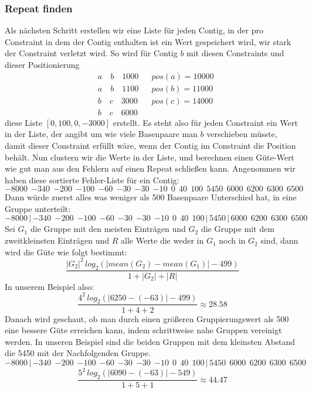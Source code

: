 \documentclass[12pt,ngerman,titlepage,a4paper]{article}
\begin{document}
\subsubsection*{Repeat finden} 
Als nächsten Schritt erstellen wir eine Liste für jeden Contig, in der pro Constraint in dem der Contig enthalten ist ein Wert gespeichert wird, wir stark der Constraint verletzt wird. So wird für Contig $b$ mit diesen Constraints und dieser Positionierung
\begin{align*}
&a \quad b \quad 1000 &&pos(a) = 10000\\
&a \quad b \quad 1100 &&pos(b) = 11000\\
&b \quad c \quad 3000 &&pos(c) = 14000\\
&b \quad c \quad 6000
\end{align*}
diese Liste $[0, 100, 0, -3000]$ erstellt. Es steht also für jeden Constraint ein Wert in der Liste, der angibt um wie viele Basenpaare man $b$ verschieben müsste, damit dieser Constraint erfüllt wäre, wenn der Contig im Constraint die Position behält.
Nun clustern wir die Werte in der Liste, und berechnen einen Güte-Wert wie gut man aus den Fehlern auf einen Repeat schließen kann.
Angenommen wir haben diese sortierte Fehler-Liste für ein Contig:
{\footnotesize \[ {-8000} \ \ {-340} \ \ {-200} \ \ {-100} \ \ {-60} \ \ {-30} \ \ {-30} \ \ {-10} \ \ 0 \ \ 40 \ \ 100 \ \ 5450 \ \ 6000 \ \ 6200 \ \ 6300 \ \ 6500\]}
Dann würde zuerst alles was weniger als 500 Basenpaare Unterschied hat, in eine Gruppe unterteilt:
{\footnotesize \[ {-8000} \, | \, {-340} \ \ {-200} \ \ {-100} \ \ {-60} \ \ {-30} \ \ {-30} \ \ {-10} \ \ 0 \ \ 40 \ \ 100 \, | \, 5450 \,| \, 6000 \ \ 6200 \ \ 6300 \ \ 6500\]}
Sei $G_1$ die Gruppe mit den meisten Einträgen und $G_2$ die Gruppe mit dem zweitkleinsten Einträgen und $R$ alle Werte die weder in $G_1$ noch in $G_2$ sind, dann wird die Güte wie folgt bestimmt:
\[\frac{|G_2|^2 \, log_2( |mean(G_2) - mean(G_1)| - 499 )}{1 + |G_2| + |R| }\]
In unserem Beispiel also:
\[\frac{4^2 \, log_2( |6250 - (-63)| - 499 )}{1 + 4 + 2 } \approx 28.58\]
Danach wird geschaut, ob man durch einen größeren Gruppierungswert als 500 eine bessere Güte erreichen kann, indem schrittweise nahe Gruppen vereinigt werden. In unseren Beispiel sind die beiden Gruppen mit dem kleinsten Abstand die 5450 mit der Nachfolgenden Gruppe.
{\footnotesize \[ {-8000} \, | \, {-340} \ \ {-200} \ \ {-100} \ \ {-60} \ \ {-30} \ \ {-30} \ \ {-10} \ \ 0 \ \ 40 \ \ 100 \, | \, 5450 \ \ 6000 \ \ 6200 \ \ 6300 \ \ 6500\]}
\[\frac{5^2 \, log_2( |6090 - (-63)| - 549 )}{1 + 5 + 1 } \approx 44.47\]
\end{document}
